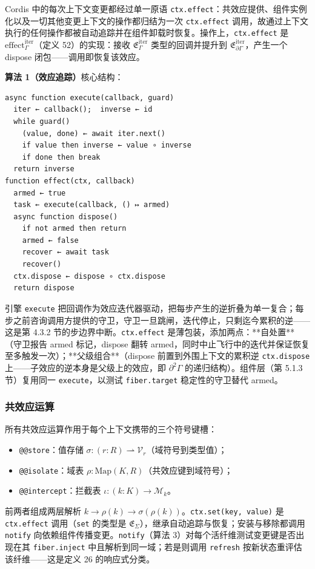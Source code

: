 \documentclass[11pt,a4paper]{article}
\theoremstyle{plain}
\theoremstyle{definition}
\theoremstyle{remark}
\begin{document}
Cordis 中的每次上下文变更都经过单一原语 \texttt{ctx.effect}：共效应提供、组件实例化以及一切其他变更上下文的操作都归结为一次 \texttt{ctx.effect} 调用，故通过上下文执行的任何操作都被自动追踪并在组件卸载时恢复。操作上，\texttt{ctx.effect} 是 $\mathrm{effect}_\Gamma^{\mathrm{iter}}$（定义 52）的实现：接收 $\mathfrak{E}_\Gamma^{\mathrm{iter}}$ 类型的回调并提升到 $\mathfrak{E}_{\partial\Gamma}^{\mathrm{iter}}$，产生一个 dispose 闭包——调用即恢复该效应。

\textbf{算法 1（效应追踪）}核心结构：

\begin{verbatim}
async function execute(callback, guard)
  iter ← callback();  inverse ← id
  while guard()
    (value, done) ← await iter.next()
    if value then inverse ← value ∘ inverse
    if done then break
  return inverse
function effect(ctx, callback)
  armed ← true
  task ← execute(callback, () ↦ armed)
  async function dispose()
    if not armed then return
    armed ← false
    recover ← await task
    recover()
  ctx.dispose ← dispose ∘ ctx.dispose
  return dispose
\end{verbatim}

引擎 \texttt{execute} 把回调作为效应迭代器驱动，把每步产生的逆折叠为单一复合；每步之前咨询调用方提供的守卫，守卫一旦跳闸，迭代停止，只剩迄今累积的逆——这是第 4.3.2 节的步边界中断。\texttt{ctx.effect} 是薄包装，添加两点：**自处置**（守卫报告 armed 标记，dispose 翻转 armed，同时中止飞行中的迭代并保证恢复至多触发一次）；**父级组合**（dispose 前置到外围上下文的累积逆 \texttt{ctx.dispose} 上——子效应的逆本身是父级上的效应，即 $\partial^2\Gamma$ 的递归结构）。组件层（第 5.1.3 节）复用同一 \texttt{execute}，以测试 \texttt{fiber.target} 稳定性的守卫替代 armed。

\subsubsection{共效应运算}

所有共效应运算作用于每个上下文携带的三个符号键槽：
\begin{itemize}
\item \texttt{@@store}：值存储 $\sigma : (r : R) \rightharpoonup \mathcal{V}_r$（域符号到类型值）；
\item \texttt{@@isolate}：域表 $\rho : \mathrm{Map}(K, R)$（共效应键到域符号）；
\item \texttt{@@intercept}：拦截表 $\iota : (k : K) \to \mathcal{M}_k$。
\end{itemize}

前两者组成两层解析 $k \to \rho(k) \to \sigma(\rho(k))$。\texttt{ctx.set(key, value)} 是 \texttt{ctx.effect} 调用（\texttt{set} 的类型是 $\mathfrak{E}_\Sigma$），继承自动追踪与恢复；安装与移除都调用 \texttt{notify} 向依赖组件传播变更。\texttt{notify}（算法 3）对每个活纤维测试变更键是否出现在其 \texttt{fiber.inject} 中且解析到同一域；若是则调用 \texttt{refresh} 按新状态重评估该纤维——这是定义 26 的响应式分类。
\end{document}
